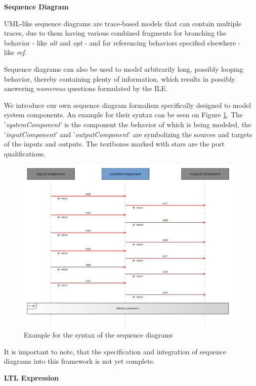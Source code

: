 \textbf{Sequence Diagram}

UML-like sequence diagrams are trace-based models that can contain multiple traces, due to them having various combined fragments for branching the behavior - like \textit{alt} and \textit{opt} - and for referencing behaviors specified elsewhere - like \textit{ref}.

Sequence diagrams can also be used to model arbitrarily long, possibly looping behavior, thereby containing plenty of information, which results in possibly answering \textit{numerous} questions formulated by the ILE.

We introduce our own sequence diagram formalism specifically designed to model system components. An example for their syntax can be seen on Figure \ref{fig_sequencediagram}. The '\textit{systemComponent}' is the component the behavior of which is being modeled, the '\textit{inputComponent}' and '\textit{outputComponent}' are symbolizing the sources and targets of the inputs and outputs. The textboxes marked with stars are the port qualifications.

\begin{figure}[!ht] 
	\centering
	\includegraphics[width=130mm, keepaspectratio]{figures/sequencediagram.png}
	\caption{Example for the syntax of the sequence diagrams}
	\label{fig_sequencediagram}
\end{figure}


It is important to note, that the specification and integration of sequence diagrams into this framework is not yet complete. 

\textbf{LTL Expression}

